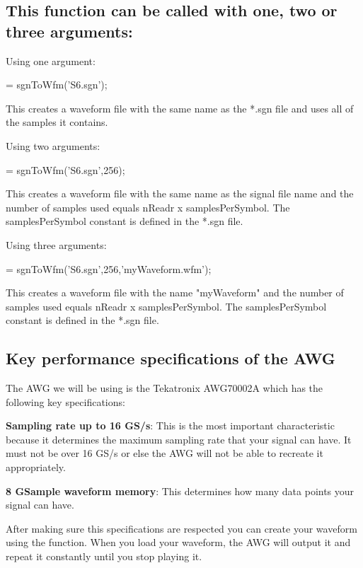 \subsection*{This function can be called with one, two or three arguments:}
Using one argument:

\bigskip

 = sgnToWfm('S6.sgn');
\bigskip

\noindent
This creates a waveform file with the same name as the *.sgn file and uses all of the samples it contains.
\bigskip

\noindent
Using two arguments:

\bigskip

 = sgnToWfm('S6.sgn',256);
\bigskip

\noindent
This creates a waveform file with the same name as the signal file name and the number of samples used equals nReadr x samplesPerSymbol. The samplesPerSymbol constant is defined in the *.sgn file.
\bigskip

\noindent
Using three arguments:

\bigskip

 = sgnToWfm('S6.sgn',256,'myWaveform.wfm');
\bigskip

\noindent
This creates a waveform file with the name "myWaveform" and the number of samples used equals nReadr x samplesPerSymbol. The samplesPerSymbol constant is defined in the *.sgn file.


\subsection*{Key performance specifications of the AWG}

The AWG we will be using is the Tekatronix AWG70002A which has the following key specifications:
\bigskip

\textbf{Sampling rate up to 16 GS/s}: This is the most important characteristic  because it determines the maximum sampling rate that your signal can have. It must not be over 16 GS/s or else the AWG will not be able to recreate it appropriately.
\bigskip

\textbf{8 GSample waveform memory}: This determines how many data points your signal can have. 
\bigskip


After making sure this specifications are respected you can create your waveform using the function. When you load your waveform, the AWG will output it and repeat it constantly until you stop playing it.



